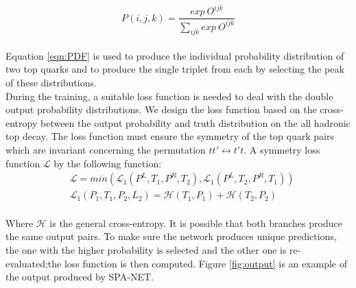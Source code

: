 \\
\begin{equation}\label{eqn:PDF}
	P(i,j,k) = \frac{exp\ O^{ijk}}{\sum_{ijk} exp\ O^{ijk}}
\end{equation}
\\
Equation \ref{eqn:PDF} is used to produce the individual probability distribution of two top quarks and to produce the single triplet from each by selecting the peak of these distributions. 
\\
During the training, a suitable loss function is needed to deal with the double output probability distributions. We design the loss function based on the cross-entropy between the output probability and truth distribution on the all hadronic top decay. The loss function must ensure the symmetry of the top quark pairs which are invariant concerning the permutation $tt' \leftrightarrow t't$.  A symmetry loss function $\mathcal{L}$ by the following function:
\\
\begin{align}
		&\mathcal{L} = min(\mathcal{L}_{1}(P^{L}, T_{1}, P^{R}, T_{2}), \mathcal{L}_{1}(P^{L}, T_{2}, P^{R}, T_{1})) \\
		&\mathcal{L}_{1}(P_{1}, T_{1}, P_{2}, L_{2}) = \mathcal{H}(T_{1}, P_{1}) +\mathcal{H}(T_{2}, P_{2})
\end{align}
\\
Where $\mathcal{H}$ is the general cross-entropy. It is possible that both branches produce the same output pairs. To make sure the network produces unique predictions, the one with the higher probability is selected and the other one is re-evaluated;the loss function is then computed. Figure \ref{fig:output} is an example of the output produced by SPA-NET.










